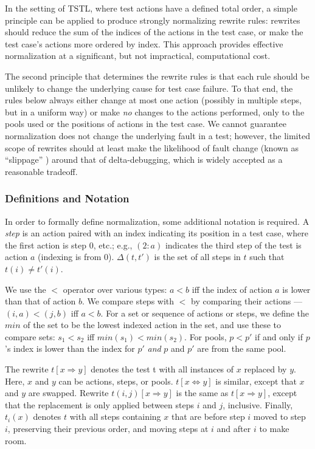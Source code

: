 In the setting of TSTL, where test actions have a defined total
order, a simple principle can be applied to produce strongly
normalizing rewrite rules: rewrites should reduce the sum of the
indices of the actions in the test case, or make the test case's
actions more ordered by index.  This approach
provides effective normalization at a significant, but not
impractical, computational cost.

The second principle that determines the rewrite rules is that each
rule should be unlikely to change the underlying cause for test case
failure.  To that end, the rules below always either change at most
one action (possibly in multiple steps, but in a uniform way) or make
\emph{no} changes to the actions performed, only to the pools used or the
positions of actions in the test case.  We cannot guarantee
normalization does not change the underlying fault in a test; however,
the limited scope of rewrites should at least make the likelihood of
fault change (known as ``slippage'' \cite{PLDI13}) around that of
delta-debugging, which is widely accepted as a reasonable tradeoff.

\subsubsection{Definitions and Notation}

In order to formally define normalization, some additional notation is required.
A \emph{step} is an action paired with an index indicating its
position in a test case,
where the first action is step 0, etc.; e.g., $(2: a)$ indicates the
third step of the test is action $a$ (indexing is from 0). 
$\Delta(t,t')$ is the set of all steps in $t$ such that $t(i) \not= t'(i)$.

We use the $<$ operator over various types:
$a < b$ iff the index of action $a$ is lower
than that of action $b$.  We compare steps with $<$ by comparing their
actions --- $(i,a) < (j,b)$ iff $a < b$.  For a set or sequence of actions or steps, we define the $min$ of the
set to be the lowest indexed action in the set, and use
these to compare sets:  $s_1 < s_2$ iff $min(s_1) < min(s_2)$. For pools,
$p < p'$ if and only if $p$'s index is lower than the index for $p'$
\emph{and} $p$ and $p'$ are from the same pool.

The rewrite $t[x \Rightarrow y]$ denotes the test t with all instances of $x$
replaced by $y$.  Here, $x$ and $y$ can be actions, steps, or pools.
$t[x \Leftrightarrow y]$ is similar, except that $x$ and $y$ are
swapped.  Rewrite $t(i,j)[x \Rightarrow y]$ is the same as $t[x \Rightarrow
y]$, except that the replacement is only applied between steps $i$ and
$j$, inclusive.  Finally, $t_i(x)$ denotes $t$ with all steps
containing $x$ that are before step $i$ moved to step $i$, preserving
their previous order, and moving steps at $i$ and after $i$ to make room.

